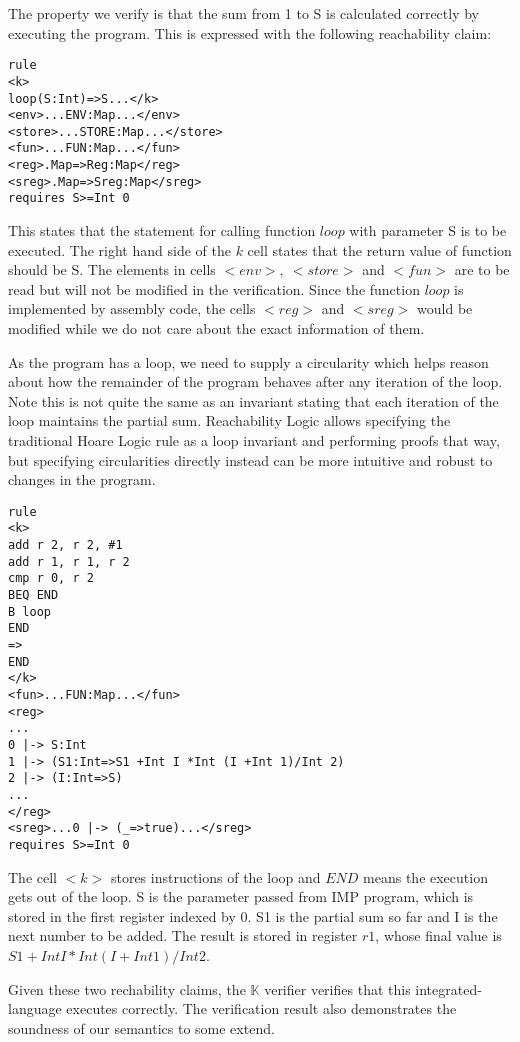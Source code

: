 \documentclass[conference]{IEEEtran}
\begin{document}
\par The property we verify is that the sum from 1 to S is calculated correctly by executing the program. This is expressed with the following reachability claim:

\lstset{style=k}
\begin{minipage}{0.7\textwidth}
\fontsize{7.8}{9.36}\selectfont
\begin{BVerbatim}
rule
<k>
loop(S:Int)=>S...</k>
<env>...ENV:Map...</env>
<store>...STORE:Map...</store>
<fun>...FUN:Map...</fun>
<reg>.Map=>Reg:Map</reg>
<sreg>.Map=>Sreg:Map</sreg>
requires S>=Int 0
\end{BVerbatim}
\end{minipage}

\par This states that the statement for calling function $loop$ with parameter S is to be executed. The right hand side of the $k$ cell states that the return value of function should be S. The elements in cells $<env>,~<store>$ and $<fun>$ are to be read but will not be modified in the verification. Since the function $loop$ is implemented by assembly code, the cells $<reg>$ and $<sreg>$ would be modified while we do not care about the exact information of them.
\par As the program has a loop, we need to supply a circularity which helps
reason about how the remainder of the program behaves after any iteration of the loop. Note this is not quite
the same as an invariant stating that each iteration of the loop maintains the partial sum. Reachability Logic allows specifying the traditional Hoare Logic rule as a loop invariant and performing proofs that way, but specifying circularities directly instead can be more intuitive and robust to changes in the program.

\lstset{style=k}
\begin{minipage}{0.35\textwidth}
\fontsize{7.8}{9.36}\selectfont
\begin{BVerbatim}
rule
<k>
add r 2, r 2, #1
add r 1, r 1, r 2
cmp r 0, r 2
BEQ END
B loop
END
=>
END
</k>
<fun>...FUN:Map...</fun>
<reg>
...
0 |-> S:Int
1 |-> (S1:Int=>S1 +Int I *Int (I +Int 1)/Int 2)
2 |-> (I:Int=>S)
...
</reg>
<sreg>...0 |-> (_=>true)...</sreg>
requires S>=Int 0
\end{BVerbatim}
\end{minipage}

\par The cell $<k>$ stores instructions of the loop and $END$ means the execution gets out of the loop. S is the parameter passed from IMP program, which is stored in the first register indexed by 0. S1 is the partial sum so far and I is the next number to be added. The result is stored in register $r1$, whose final value is $S1 +Int I *Int (I +Int 1)/Int 2$.
\par Given these two rechability claims, the $\mathbb{K}$ verifier verifies that this integrated-language executes correctly. The verification result also demonstrates the soundness of our semantics to some extend.
\end{document}
